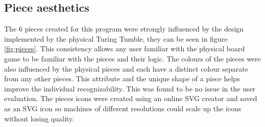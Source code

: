 \documentclass{l4proj}
\begin{document}
\subsection{Piece aesthetics}
The 6 pieces created for this program were strongly influenced by the design implemented by the physical Turing Tumble, they can be seen in figure \ref{fig:pieces}. This consistency allows any user familiar with the physical board game to be familiar with the pieces and their logic. The colours of the pieces were also influenced by the physical pieces and each have a distinct colour separate from any other pieces. This attribute and the unique shape of a piece helps improve the individual recognizability. This was found to be no issue in the user evaluation. The pieces icons were created using an online SVG creator \citep{noauthor_method_nodate} and saved as an SVG icon so machines of different resolutions could scale up the icons without losing quality. 
\end{document}
